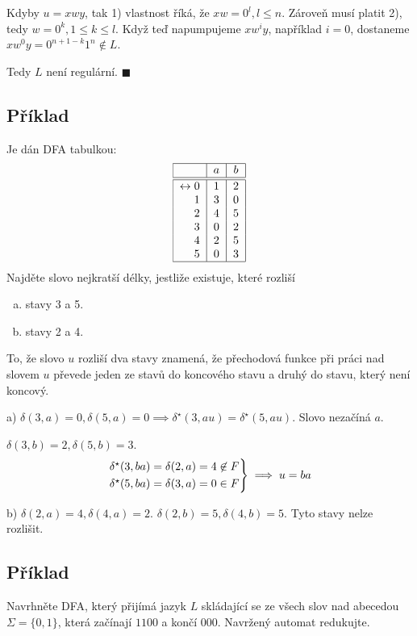 Kdyby $u = xwy$, tak 1) vlastnost říká, že $xw = 0^l, l \leq n$. Zároveň musí platit 2), tedy $w = 0^k, 1 \leq k \leq l$.
Když teď napumpujeme $xw^i y$, například $i=0$, dostaneme $xw^0 y = 0^{n+1-k} 1^{n} \not\in L$.

Tedy $L$ není regulární. $\blacksquare$

\subsection{Příklad}
Je dán DFA tabulkou:
\[
\begin{tabular}{|r|c|c|}
    \hline
    & $a$ & $b$\\
    \hline
    \hline
    $\leftrightarrow 0$& $1$ & $2$\\
    $1$                & $3$ & $0$\\
    $2$                & $4$ & $5$\\
    $3$                & $0$ & $2$\\
    $4$                & $2$ & $5$\\
    $5$                & $0$ & $3$\\
    \hline
\end{tabular}
\]
Najděte slovo nejkratší délky, jestliže existuje, které rozliší
\begin{enumerate}[a), noitemsep]
    \item stavy 3 a 5.
    \item stavy 2 a 4.
\end{enumerate}
To, že slovo $u$ rozliší dva stavy znamená, že přechodová funkce při práci nad slovem $u$ převede jeden ze stavů do 
koncového stavu a druhý do stavu, který není koncový.

a) $\delta(3,a) = 0, \delta(5,a)=0 \implies \delta^\star(3, au) = \delta^\star (5, au)$.
Slovo nezačíná $a$.

$\delta(3,b) = 2, \delta(5, b) = 3$.
\[
\begin{rcases*}
\delta^\star(3,ba) = \delta(2,a) = 4 \not\in F\\
\delta^\star(5,ba) = \delta(3,a) = 0 \in F
\end{rcases*} \implies u = ba
\]

b) $\delta(2,a) = 4, \delta(4,a) =2$. $\delta(2,b)=5, \delta(4,b)=5$. Tyto stavy nelze rozlišit.

\subsection{Příklad}
Navrhněte DFA, který přijímá jazyk $L$ skládající se ze všech slov nad abecedou $\Sigma = \{0, 1\}$, která začínají 
$1100$ a končí $000$. Navržený automat redukujte.

